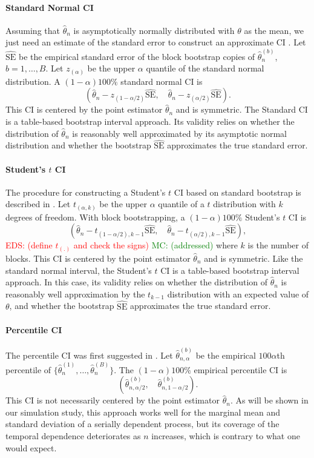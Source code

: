 \documentclass[12pt, letterpaper, titlepage]{article}
\newcommand{\eds}[1]{\textcolor{red}{EDS: (#1)}}
\newcommand{\mc}[1]{\textcolor{green}{MC: (#1)}}
\begin{document}
\paragraph{Standard Normal CI}
Assuming that $\hat\theta_n$ is asymptotically normally distributed with
$\theta$ as the mean, we just need an estimate of the standard error to
construct an approximate CI \citep[p.168]{efron1993introduction}.
Let $\widehat{\text{SE}}$ be the empirical standard error of the block bootstrap
copies of $\hat\theta_n^{(b)}$, $b = 1, \ldots, B$. Let $z_{(\alpha)}$ be the
upper $\alpha$ quantile of the standard normal distribution.
A $(1 - \alpha)100\%$ standard normal CI is
\[
(\hat{\theta}_{n} - z_{(1-\alpha/2)}\widehat{\text{SE}}, \quad
\hat{\theta}_{n} - z_{(\alpha/2)}\widehat{\text{SE}}).
\]
This CI is centered by the point estimator $\hat\theta_n$ and is symmetric. The
Standard CI is a table-based bootstrap interval
approach. Its validity relies on whether the distribution of $\hat\theta_n$ is
 reasonably
well approximated by its asymptotic normal distribution and whether the
bootstrap $\widehat{\text{SE}}$ approximates the true standard error.


\paragraph{Student's $t$ CI}
The procedure for constructing a Student's $t$ CI based on standard bootstrap
is described in \citet[p.158]{efron1993introduction}. Let $t_{(\alpha, k)}$ be the
upper $\alpha$ quantile of a $t$ distribution with $k$ degrees of freedom.
With block bootstrapping, a $(1 - \alpha)100\%$ Student's $t$ CI is
\[
(\hat{\theta}_{n} - t_{(1-\alpha/2), k - 1}\hat{\text{SE}}, \quad
\hat{\theta}_{n} - t_{(\alpha/2), k -1}\hat{\text{SE}}),
\]
\eds{define $t_{(.)}$ and check the signs}  \mc{addressed}
where $k$ is the number of blocks.
This CI is centered by the point estimator $\hat\theta_n$ and is symmetric.
Like the standard 
normal interval, the Student's $t$ CI is a table-based bootstrap interval
approach. In this case,
its validity relies on whether the distribution of $\hat\theta_n$ is
reasonably well approximation by the $t_{k-1}$ distribution with an
expected value of $\theta$, and whether the bootstrap 
$\widehat{\text{SE}}$ approximates the true standard error.


\paragraph{Percentile CI}
The percentile CI was first suggested in \citet{efron1979bootstrap}.
Let $\hat\theta_{n, \alpha}^{(b)}$ be the empirical $100\alpha$th percentile of
$\{\hat\theta_n^{(1)}, \ldots, \hat\theta_n^{(B)}\}$. The $(1 - \alpha)100\%$
empirical percentile CI is
\[
(\hat\theta_{n, \alpha/2}^{(b)}, \quad \hat\theta_{n, 1 - \alpha/2}^{(b)}).
\]
This CI is not necessarily centered by the point estimator $\hat\theta_n$.
As will be shown in our simulation study, this approach works well for the
marginal mean and standard deviation of a serially dependent process, but its
coverage of the temporal dependence deteriorates as $n$ increases, which is
contrary to what one would expect.
\end{document}
